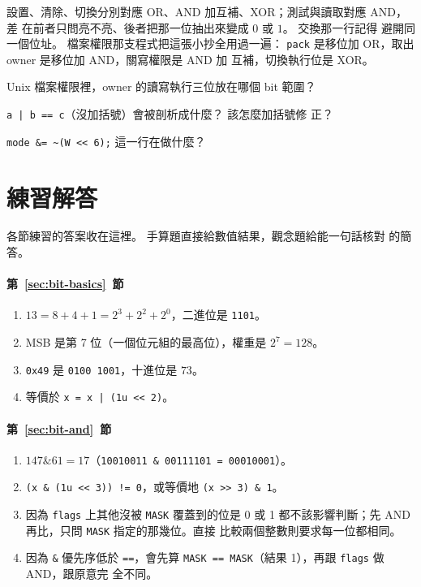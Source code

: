 設置、清除、切換分別對應 OR、AND 加互補、XOR；測試與讀取對應 AND，差
在前者只問亮不亮、後者把那一位抽出來變成 $0$ 或 $1$。 交換那一行記得
避開同一個位址。 檔案權限那支程式把這張小抄全用過一遍：
\texttt{pack} 是移位加 OR，取出 owner 是移位加 AND，關寫權限是 AND 加
互補，切換執行位是 XOR。

\begin{drills}[label=drills:bit-applications]
\item Unix 檔案權限裡，owner 的讀寫執行三位放在哪個 bit 範圍？
\item \texttt{a | b == c}（沒加括號）會被剖析成什麼？ 該怎麼加括號修
正？
\item \texttt{mode \&= \~{}(W << 6);} 這一行在做什麼？
\end{drills}

\section*{練習解答}

各節練習的答案收在這裡。 手算題直接給數值結果，觀念題給能一句話核對
的簡答。

\paragraph{第~\ref{sec:bit-basics}~節}
\begin{enumerate}
\item $13 = 8 + 4 + 1 = 2^3 + 2^2 + 2^0$，二進位是 \texttt{1101}。
\item MSB 是第 7 位（一個位元組的最高位），權重是 $2^7 = 128$。
\item \texttt{0x49} 是 \texttt{0100 1001}，十進位是 $73$。
\item 等價於 \texttt{x = x | (1u << 2)}。
\end{enumerate}

\paragraph{第~\ref{sec:bit-and}~節}
\begin{enumerate}
\item $147 \& 61 = 17$（\texttt{10010011 \& 00111101 = 00010001}）。
\item \texttt{(x \& (1u << 3)) != 0}，或等價地 \texttt{(x >> 3) \& 1}。
\item 因為 \texttt{flags} 上其他沒被 \texttt{MASK} 覆蓋到的位是 0 或
1 都不該影響判斷；先 AND 再比，只問 \texttt{MASK} 指定的那幾位。直接
比較兩個整數則要求每一位都相同。
\item 因為 \texttt{\&} 優先序低於 \texttt{==}，會先算
\texttt{MASK == MASK}（結果 1），再跟 \texttt{flags} 做 AND，跟原意完
全不同。
\end{enumerate}

